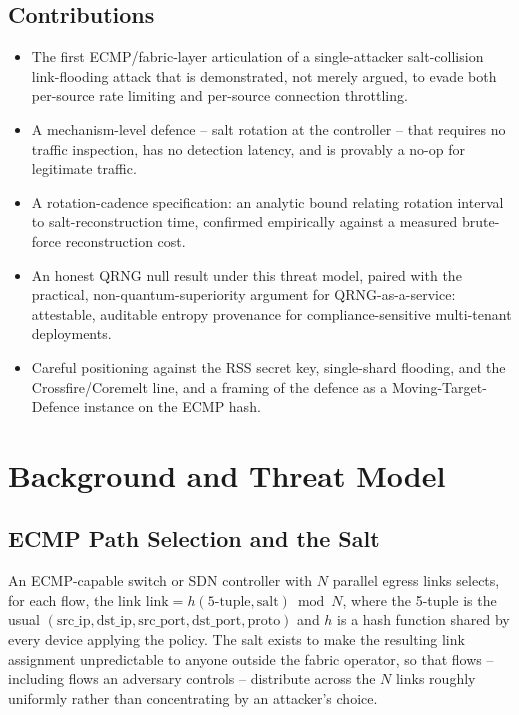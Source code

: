 \documentclass[conference]{IEEEtran}
\begin{document}
\subsection*{Contributions}
\begin{itemize}
\item The first ECMP/fabric-layer articulation of a single-attacker salt-collision link-flooding attack that is
demonstrated, not merely argued, to evade both per-source rate limiting and per-source connection throttling.
\item A mechanism-level defence -- salt rotation at the controller -- that requires no traffic inspection, has
no detection latency, and is provably a no-op for legitimate traffic.
\item A rotation-cadence specification: an analytic bound relating rotation interval to salt-reconstruction time,
confirmed empirically against a measured brute-force reconstruction cost.
\item An honest QRNG null result under this threat model, paired with the practical, non-quantum-superiority
argument for QRNG-as-a-service: attestable, auditable entropy provenance for compliance-sensitive multi-tenant
deployments.
\item Careful positioning against the RSS secret key, single-shard flooding, and the Crossfire/Coremelt line, and
a framing of the defence as a Moving-Target-Defence instance on the ECMP hash.
\end{itemize}

\section{Background and Threat Model}

\subsection{ECMP Path Selection and the Salt}

An ECMP-capable switch or SDN controller with $N$ parallel egress links selects, for each flow, the link
$\mathrm{link} = h(\mathrm{5\text{-}tuple}, \mathrm{salt}) \bmod N$, where the 5-tuple is the usual
$(\mathrm{src\_ip}, \mathrm{dst\_ip}, \mathrm{src\_port}, \mathrm{dst\_port}, \mathrm{proto})$ and $h$ is a hash
function shared by every device applying the policy. The salt exists to make the resulting link assignment
unpredictable to anyone outside the fabric operator, so that flows -- including flows an adversary controls --
distribute across the $N$ links roughly uniformly rather than concentrating by an attacker's choice.
\end{document}
